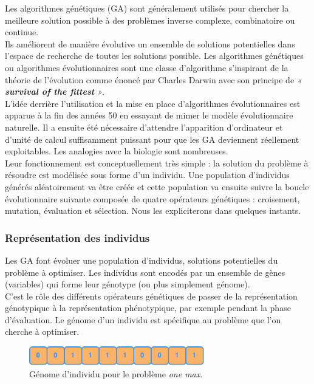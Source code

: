 \documentclass[french, 11pt]{memoir}
\begin{document}
\bigskip
Les algorithmes génétiques (GA) sont généralement utilisés pour chercher
la meilleure solution possible à des problèmes inverse complexe,
combinatoire ou continue. \\
Ils améliorent de manière évolutive un ensemble de solutions
potentielles dans l'espace de recherche de toutes les solutions
possible. Les algorithmes génétiques ou algorithmes évolutionnaires sont
une classe d'algorithme s'inspirant de la théorie de l'évolution comme
énoncé par Charles Darwin avec son principe de \emph{« \textbf{survival
of the fittest} »}. \\ 
L'idée derrière l'utilisation et la mise en place
d'algorithmes évolutionnaires est apparue à la fin des années 50\cite{john1992adaptation} en
essayant de mimer le modèle évolutionnaire naturelle. Il a ensuite été
nécessaire d'attendre l'apparition d'ordinateur et d'unité de calcul
suffisamment puissant pour que les GA deviennent réellement
exploitables. Les analogies avec la biologie sont nombreuses. \\
Leur fonctionnement est conceptuellement très simple : la solution du
problème à résoudre est modélisée sous forme d'un individu. Une
population d'individus générés aléatoirement va être créée et cette
population va ensuite suivre la boucle évolutionnaire suivante composée
de quatre opérateurs génétiques : croisement, mutation, évaluation et
sélection. Nous les expliciterons dans quelques instants.

\subsubsection{Représentation des
individus}\label{repruxe9sentation-des-individus}

Les GA font évoluer une population d'individus, solutions potentielles
du problème à optimiser. Les individus sont encodés par un ensemble de
gènes (variables) qui forme leur génotype (ou plus simplement génome). \\
C'est le rôle des différents opérateurs génétiques de passer de la
représentation génotypique à la représentation phénotypique, par exemple
pendant la phase d'évaluation. Le génome d'un individu est spécifique au
problème que l'on cherche à optimiser.

\begin{figure}[htbp]
	\begin{center}
		\includegraphics[width=3in]{img/onemax}
		\caption{Génome d'individu pour le problème \textit{one max}.}
	\end{center}
\end{figure}
\end{document}
